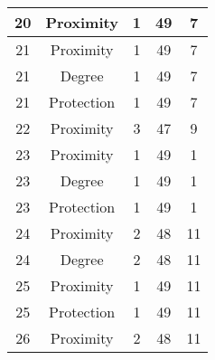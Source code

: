 \documentclass[results.tex]{subfiles}
\begin{document}
\begin{center}
\begin{tabular}{| c || c | c | c | c |}
            \hline
            20                      & Proximity                    & 1                      & 49                      & 7                    \\
            \hline
            21                      & Proximity                    & 1                      & 49                      & 7                    \\
            \hline
            21                      & Degree                       & 1                      & 49                      & 7                    \\
            \hline
            21                      & Protection                   & 1                      & 49                      & 7                    \\
            \hline
            22                      & Proximity                    & 3                      & 47                      & 9                    \\
            \hline
            23                      & Proximity                    & 1                      & 49                      & 1                    \\
            \hline
            23                      & Degree                       & 1                      & 49                      & 1                    \\
            \hline
            23                      & Protection                   & 1                      & 49                      & 1                    \\
            \hline
            24                      & Proximity                    & 2                      & 48                      & 11                   \\
            \hline
            24                      & Degree                       & 2                      & 48                      & 11                   \\
            \hline
            25                      & Proximity                    & 1                      & 49                      & 11                   \\
            \hline
            25                      & Protection                   & 1                      & 49                      & 11                   \\
            \hline
            26                      & Proximity                    & 2                      & 48                      & 11                   \\

\end{tabular}
\end{center}
\end{document}
